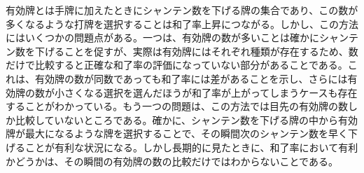 有効牌とは手牌に加えたときにシャンテン数を下げる牌の集合であり、この数が多くなるような打牌を選択することは和了率上昇につながる。しかし、この方法にはいくつかの問題点がある。一つは、有効牌の数が多いことは確かにシャンテン数を下げることを促すが、実際は有効牌にはそれぞれ種類が存在するため、数だけで比較すると正確な和了率の評価になっていない部分があることである。これは、有効牌の数が同数であっても和了率には差があることを示し、さらには有効牌の数が小さくなる選択を選んだほうが和了率が上がってしまうケースも存在することがわかっている。もう一つの問題は、この方法では目先の有効牌の数しか比較していないところである。確かに、シャンテン数を下げる牌の中から有効牌が最大になるような牌を選択することで、その瞬間次のシャンテン数を早く下げることが有利な状況になる。しかし長期的に見たときに、和了率において有利かどうかは、その瞬間の有効牌の数の比較だけではわからないことである。


